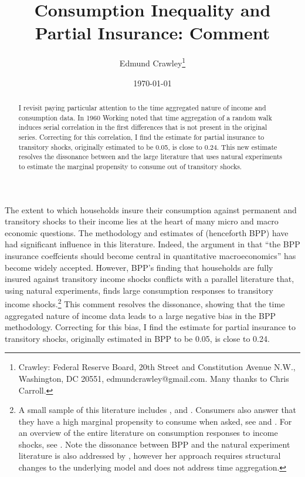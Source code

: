 \documentclass[AER]{AEA}
\begin{document}
\title{Consumption Inequality and Partial Insurance: Comment}
\author{Edmund Crawley\thanks{Crawley: Federal Reserve Board, 20th Street and Constitution Avenue N.W., Washington, DC 20551, edmundcrawley@gmail.com. Many thanks to Chris Carroll.}}
\date{\today}
\pubVolume{}
\pubIssue{}

\begin{abstract}
I revisit \cite{blundell_consumption_2008} paying particular attention to the time aggregated nature of income and consumption data. In 1960 Working noted that time aggregation of a random walk induces serial correlation in the first differences that is not present in the original series. Correcting for this correlation, I find the estimate for partial insurance to transitory shocks, originally estimated to be 0.05, is close to 0.24. This new estimate resolves the dissonance between \cite{blundell_consumption_2008} and the large literature that uses natural experiments to estimate the marginal propensity to consume out of transitory shocks.
\end{abstract}


\maketitle

The extent to which households insure their consumption against permanent and transitory shocks to their income lies at the heart of many micro and macro economic questions. The methodology and estimates of \cite{blundell_consumption_2008} (henceforth BPP) have had significant influence in this literature. Indeed, the argument in \cite{kaplan_how_2010} that ``the BPP insurance coeffcients should become central in quantitative macroeconomics'' has become widely accepted. However, BPP's finding that households are fully insured against transitory income shocks conflicts with a parallel literature that, using natural experiments, finds large consumption responses to transitory income shocks.\footnote{A small sample of this literature includes \cite{parker_consumer_2013}, \cite{agarwal_consumption_2014} and \cite{Sahmetal:2008TaxRebates}. Consumers also answer that they have a high marginal propensity to consume when asked, see \cite{fuster_what_2018} and \cite{jappelli_fiscal_2014}. For an overview of the entire literature on consumption responses to income shocks, see \cite{jappelli_consumption_2010}. Note the dissonance between BPP and the natural experiment literature is also addressed by \cite{commault_how_2017}, however her approach requires structural changes to the underlying model and does not address time aggregation.} This comment resolves the dissonance, showing that the time aggregated nature of income data leads to a large negative bias in the BPP methodology. Correcting for this bias, I find the estimate for partial insurance to transitory shocks, originally estimated in BPP to be 0.05, is close to 0.24.
\end{document}
